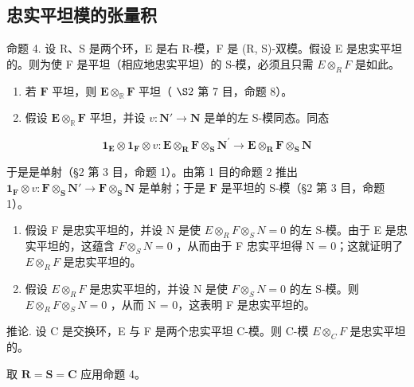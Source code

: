 \subsection{忠实平坦模的张量积}

命题 4. 设 R、S 是两个环，E 是右 R-模，F 是 (R, S)-双模。假设 E 是忠实平坦的。则为使 F 是平坦（相应地忠实平坦）的 S-模，必须且只需 \(E \otimes_{R} F\) 是如此。

\begin{enumerate}
\def\labelenumi{(\arabic{enumi})}
\item
  若 \(\mathbf{F}\) 平坦，则 \(\mathbf{E} \otimes_{\mathbb{R}} \mathbf{F}\) 平坦（ \(\S 2\) 第 7 目，命题 8）。
\item
  假设 \(\mathbf{E} \otimes_{\mathbb{R}} \mathbf{F}\) 平坦，并设 \(v: \mathbf{N}' \to \mathbf{N}\) 是单的左 S-模同态。同态
\end{enumerate}

\[
  \mathbf {1} _ {\mathbf {E}} \otimes \mathbf {1} _ {\mathbf {F}} \otimes v: \mathbf {E} \otimes_ {\mathbf {R}} \mathbf {F} \otimes_ {\mathbf {S}} \mathbf {N} ^ {\prime} \rightarrow \mathbf {E} \otimes_ {\mathbf {R}} \mathbf {F} \otimes_ {\mathbf {S}} \mathbf {N}
\]

于是是单射（§2 第 3 目，命题 1）。由第 1 目的命题 2 推出 \(\mathbf{1}_{\mathbf{F}} \otimes v \colon \mathbf{F} \otimes_{\mathbf{S}} \mathbf{N}' \to \mathbf{F} \otimes_{\mathbf{S}} \mathbf{N}\) 是单射；于是 \(\mathbf{F}\) 是平坦的 S-模（§2 第 3 目，命题 1）。

\begin{enumerate}
\def\labelenumi{(\arabic{enumi})}
\setcounter{enumi}{2}
\item
  假设 F 是忠实平坦的，并设 N 是使 \(E \otimes_{R} F \otimes_{S} N = 0\) 的左 S-模。由于 E 是忠实平坦的，这蕴含 \(F \otimes_{S} N = 0\) ，从而由于 F 忠实平坦得 N = 0；这就证明了 \(E \otimes_{R} F\) 是忠实平坦的。
\item
  假设 \(E \otimes_{R} F\) 是忠实平坦的，并设 N 是使 \(F \otimes_{S} N = 0\) 的左 S-模。则 \(E \otimes_{R} F \otimes_{S} N = 0\) ，从而 N = 0，这表明 F 是忠实平坦的。
\end{enumerate}

推论. 设 C 是交换环，E 与 F 是两个忠实平坦 C-模。则 C-模 \(E \otimes_{C} F\) 是忠实平坦的。

取 \(\mathbf{R} = \mathbf{S} = \mathbf{C}\) 应用命题 4。

